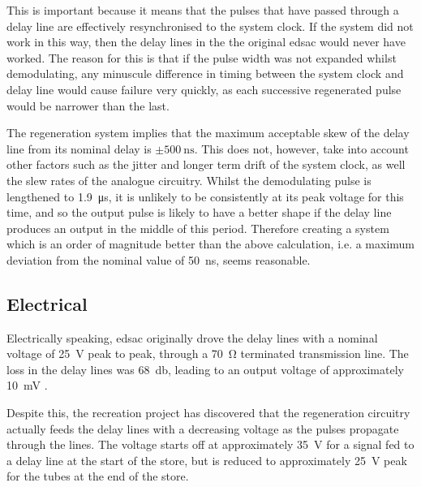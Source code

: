 This is important because it means that the pulses that have passed through a delay line are effectively resynchronised to the system clock. If the system did not work in this way, then the delay lines in the the original \gls{edsac} would never have worked. The reason for this is that if the pulse width was not expanded whilst demodulating, any minuscule difference in timing between the system clock and delay line would cause failure very quickly, as each successive regenerated pulse would be narrower than the last.

\newcommand{\maxJitterPlusSkewNs}{50} %

The regeneration system implies that the maximum acceptable skew of the delay line from its nominal delay is $\pm\SI{500}{\nano\second}$. This does not, however, take into account other factors such as the jitter and longer term drift of the system clock, as well the slew rates of the analogue circuitry. Whilst the demodulating pulse is lengthened to \SI{1.9}{\micro\second}, it is unlikely to be consistently at its peak voltage for this time, and so the output pulse is likely to have a better shape if the delay line produces an output in the middle of this period. Therefore creating a system which is an order of magnitude better than the above calculation, i.e. a maximum deviation from the nominal value of \SI{\maxJitterPlusSkewNs}{\nano\second}, seems reasonable.

\subsection{Electrical} \label{sec:review-delay-electrical}

\newcommand{\maxDelayInputV}{35}
\newcommand{\minDelayInputV}{25}

\newcommand{\maxDelayOutputmV}{100}
\newcommand{\minDelayOutputmV}{10}


Electrically speaking, \gls{edsac} originally drove the delay lines with a nominal voltage of \SI{25}{\volt} peak to peak, through a \SI{70}{\ohm} terminated transmission line. The loss in the delay lines was \SI{68}{\decibel}, leading to an output voltage of approximately \SI{10}{\milli\volt} \cite[p.212]{wilkes1948}.

Despite this, the recreation project has discovered that the regeneration circuitry actually feeds the delay lines with a decreasing voltage as the pulses propagate through the lines. The voltage starts off at approximately \SI{\maxDelayInputV}{\volt} for a signal fed to a delay line at the start of the store, but is reduced to approximately \SI{\minDelayInputV}{\volt} peak for the tubes at the end of the store.

